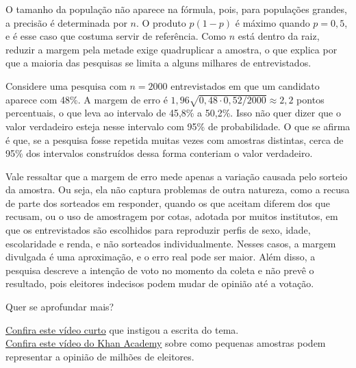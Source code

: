 {\hspace*{1.5em}
O tamanho da população não aparece na fórmula,
pois, para populações grandes, a precisão é determinada por $n$.
O produto $p(1-p)$ é máximo quando $p = 0{,}5$, e é esse caso que costuma servir de referência.
Como $n$ está dentro da raiz, reduzir a margem pela metade exige quadruplicar a amostra,
o que explica por que a maioria das pesquisas se limita a alguns milhares de entrevistados.

\subtitle{Um exemplo numérico}

\hspace*{1.5em}
Considere uma pesquisa com $n = 2000$ entrevistados em que um candidato aparece com 48\%.
A margem de erro é $1{,}96\sqrt{0{,}48 \cdot 0{,}52 / 2000} \approx 2{,}2$ pontos percentuais,
o que leva ao intervalo de 45,8\% a 50,2\%.
Isso não quer dizer que o valor verdadeiro esteja nesse intervalo com 95\% de probabilidade.
O que se afirma é que, se a pesquisa fosse repetida muitas vezes com amostras distintas,
cerca de 95\% dos intervalos construídos dessa forma conteriam o valor verdadeiro.

\subtitle{O que a margem de erro não cobre}

\hspace*{1.5em}
Vale ressaltar que a margem de erro mede apenas a variação causada pelo sorteio da amostra.
Ou seja, ela não captura problemas de outra natureza,
como a recusa de parte dos sorteados em responder, quando os que aceitam diferem dos que recusam,
ou o uso de amostragem por cotas, adotada por muitos institutos,
em que os entrevistados são escolhidos para reproduzir perfis de sexo, idade, escolaridade e renda,
e não sorteados individualmente.
Nesses casos, a margem divulgada é uma aproximação, e o erro real pode ser maior.
Além disso, a pesquisa descreve a intenção de voto no momento da coleta e não prevê o resultado,
pois eleitores indecisos podem mudar de opinião até a votação.


\vspace{0.1em}
{\color{HypePurple2} Quer se aprofundar mais?}

\href{https://www.youtube.com/shorts/cEq4mvdK10o}{{\color{HypeOrange}Confira este vídeo curto}} que instigou a escrita do tema. \\
\href{https://www.youtube.com/watch?v=85NM1-FQrn0}{{\color{HypeOrange}Confira este vídeo do Khan Academy}} sobre como pequenas amostras podem representar a opinião de milhões de eleitores.

}